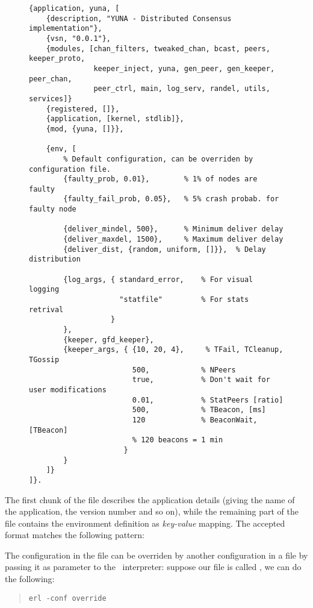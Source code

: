 \begin{figure}[tb!]
\begin{lstlisting}[label={code:ConfFile},
                   caption={default configuration file}]
{application, yuna, [
    {description, "YUNA - Distributed Consensus implementation"},
    {vsn, "0.0.1"},
    {modules, [chan_filters, tweaked_chan, bcast, peers, keeper_proto,
               keeper_inject, yuna, gen_peer, gen_keeper, peer_chan,
               peer_ctrl, main, log_serv, randel, utils, services]}
    {registered, []},
    {application, [kernel, stdlib]},
    {mod, {yuna, []}},

    {env, [
        % Default configuration, can be overriden by configuration file.
        {faulty_prob, 0.01},        % 1% of nodes are faulty
        {faulty_fail_prob, 0.05},   % 5% crash probab. for faulty node

        {deliver_mindel, 500},      % Minimum deliver delay
        {deliver_maxdel, 1500},     % Maximum deliver delay
        {deliver_dist, {random, uniform, []}},  % Delay distribution

        {log_args, { standard_error,    % For visual logging
                     "statfile"         % For stats retrival
                   }
        },
        {keeper, gfd_keeper},
        {keeper_args, { {10, 20, 4},     % TFail, TCleanup, TGossip
                        500,            % NPeers
                        true,           % Don't wait for user modifications
                        0.01,           % StatPeers [ratio]
                        500,            % TBeacon, [ms]
                        120             % BeaconWait, [TBeacon]
                        % 120 beacons = 1 min
                      }
        }
    ]}
]}.
\end{lstlisting}
\end{figure}

The first chunk of the file describes the application details (giving
the name of the application, the version number and so on), while the
remaining part of the file contains the environment definition as
\emph{key-value} mapping. The accepted format matches the following
pattern:

\begin{quote}
\centering
{}
\end{quote}

The configuration in the  file can be overriden by another
configuration in a  file by passing it as parameter to the
\Erlang\ interpreter: suppose our file is called , we
can do the following:
\begin{quote}
\begin{verbatim}
erl -conf override
\end{verbatim}
\end{quote}

